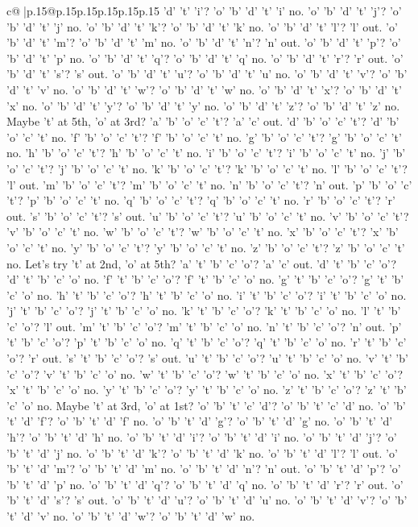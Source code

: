 \documentclass{article}
\begin{document}
{\begin{supertabular}{c@{$\;$}|p{.15\linewidth}@{}p{.15\linewidth}p{.15\linewidth}p{.15\linewidth}p{.15\linewidth}p{.15\linewidth}}
{{{'d' 't' 'i'? 'o' 'b' 'd' 't' 'i' no. 'o' 'b' 'd' 't' 'j'? 'o' 'b' 'd' 't' 'j' no. 'o' 'b' 'd' 't' 'k'? 'o' 'b' 'd' 't' 'k' no. 'o' 'b' 'd' 't' 'l'? 'l' out. 'o' 'b' 'd' 't' 'm'? 'o' 'b' 'd' 't' 'm' no. 'o' 'b' 'd' 't' 'n'? 'n' out. 'o' 'b' 'd' 't' 'p'? 'o' 'b' 'd' 't' 'p' no. 'o' 'b' 'd' 't' 'q'? 'o' 'b' 'd' 't' 'q' no. 'o' 'b' 'd' 't' 'r'? 'r' out. 'o' 'b' 'd' 't' 's'? 's' out. 'o' 'b' 'd' 't' 'u'? 'o' 'b' 'd' 't' 'u' no. 'o' 'b' 'd' 't' 'v'? 'o' 'b' 'd' 't' 'v' no. 'o' 'b' 'd' 't' 'w'? 'o' 'b' 'd' 't' 'w' no. 'o' 'b' 'd' 't' 'x'? 'o' 'b' 'd' 't' 'x' no. 'o' 'b' 'd' 't' 'y'? 'o' 'b' 'd' 't' 'y' no. 'o' 'b' 'd' 't' 'z'? 'o' 'b' 'd' 't' 'z' no. Maybe 't' at 5th, 'o' at 3rd? 'a' 'b' 'o' 'c' 't'? 'a' 'c' out. 'd' 'b' 'o' 'c' 't'? 'd' 'b' 'o' 'c' 't' no. 'f' 'b' 'o' 'c' 't'? 'f' 'b' 'o' 'c' 't' no. 'g' 'b' 'o' 'c' 't'? 'g' 'b' 'o' 'c' 't' no. 'h' 'b' 'o' 'c' 't'? 'h' 'b' 'o' 'c' 't' no. 'i' 'b' 'o' 'c' 't'? 'i' 'b' 'o' 'c' 't' no. 'j' 'b' 'o' 'c' 't'? 'j' 'b' 'o' 'c' 't' no. 'k' 'b' 'o' 'c' 't'? 'k' 'b' 'o' 'c' 't' no. 'l' 'b' 'o' 'c' 't'? 'l' out. 'm' 'b' 'o' 'c' 't'? 'm' 'b' 'o' 'c' 't' no. 'n' 'b' 'o' 'c' 't'? 'n' out. 'p' 'b' 'o' 'c' 't'? 'p' 'b' 'o' 'c' 't' no. 'q' 'b' 'o' 'c' 't'? 'q' 'b' 'o' 'c' 't' no. 'r' 'b' 'o' 'c' 't'? 'r' out. 's' 'b' 'o' 'c' 't'? 's' out. 'u' 'b' 'o' 'c' 't'? 'u' 'b' 'o' 'c' 't' no. 'v' 'b' 'o' 'c' 't'? 'v' 'b' 'o' 'c' 't' no. 'w' 'b' 'o' 'c' 't'? 'w' 'b' 'o' 'c' 't' no. 'x' 'b' 'o' 'c' 't'? 'x' 'b' 'o' 'c' 't' no. 'y' 'b' 'o' 'c' 't'? 'y' 'b' 'o' 'c' 't' no. 'z' 'b' 'o' 'c' 't'? 'z' 'b' 'o' 'c' 't' no. Let's try 't' at 2nd, 'o' at 5th? 'a' 't' 'b' 'c' 'o'? 'a' 'c' out. 'd' 't' 'b' 'c' 'o'? 'd' 't' 'b' 'c' 'o' no. 'f' 't' 'b' 'c' 'o'? 'f' 't' 'b' 'c' 'o' no. 'g' 't' 'b' 'c' 'o'? 'g' 't' 'b' 'c' 'o' no. 'h' 't' 'b' 'c' 'o'? 'h' 't' 'b' 'c' 'o' no. 'i' 't' 'b' 'c' 'o'? 'i' 't' 'b' 'c' 'o' no. 'j' 't' 'b' 'c' 'o'? 'j' 't' 'b' 'c' 'o' no. 'k' 't' 'b' 'c' 'o'? 'k' 't' 'b' 'c' 'o' no. 'l' 't' 'b' 'c' 'o'? 'l' out. 'm' 't' 'b' 'c' 'o'? 'm' 't' 'b' 'c' 'o' no. 'n' 't' 'b' 'c' 'o'? 'n' out. 'p' 't' 'b' 'c' 'o'? 'p' 't' 'b' 'c' 'o' no. 'q' 't' 'b' 'c' 'o'? 'q' 't' 'b' 'c' 'o' no. 'r' 't' 'b' 'c' 'o'? 'r' out. 's' 't' 'b' 'c' 'o'? 's' out. 'u' 't' 'b' 'c' 'o'? 'u' 't' 'b' 'c' 'o' no. 'v' 't' 'b' 'c' 'o'? 'v' 't' 'b' 'c' 'o' no. 'w' 't' 'b' 'c' 'o'? 'w' 't' 'b' 'c' 'o' no. 'x' 't' 'b' 'c' 'o'? 'x' 't' 'b' 'c' 'o' no. 'y' 't' 'b' 'c' 'o'? 'y' 't' 'b' 'c' 'o' no. 'z' 't' 'b' 'c' 'o'? 'z' 't' 'b' 'c' 'o' no. Maybe 't' at 3rd, 'o' at 1st? 'o' 'b' 't' 'c' 'd'? 'o' 'b' 't' 'c' 'd' no. 'o' 'b' 't' 'd' 'f'? 'o' 'b' 't' 'd' 'f' no. 'o' 'b' 't' 'd' 'g'? 'o' 'b' 't' 'd' 'g' no. 'o' 'b' 't' 'd' 'h'? 'o' 'b' 't' 'd' 'h' no. 'o' 'b' 't' 'd' 'i'? 'o' 'b' 't' 'd' 'i' no. 'o' 'b' 't' 'd' 'j'? 'o' 'b' 't' 'd' 'j' no. 'o' 'b' 't' 'd' 'k'? 'o' 'b' 't' 'd' 'k' no. 'o' 'b' 't' 'd' 'l'? 'l' out. 'o' 'b' 't' 'd' 'm'? 'o' 'b' 't' 'd' 'm' no. 'o' 'b' 't' 'd' 'n'? 'n' out. 'o' 'b' 't' 'd' 'p'? 'o' 'b' 't' 'd' 'p' no. 'o' 'b' 't' 'd' 'q'? 'o' 'b' 't' 'd' 'q' no. 'o' 'b' 't' 'd' 'r'? 'r' out. 'o' 'b' 't' 'd' 's'? 's' out. 'o' 'b' 't' 'd' 'u'? 'o' 'b' 't' 'd' 'u' no. 'o' 'b' 't' 'd' 'v'? 'o' 'b' 't' 'd' 'v' no. 'o' 'b' 't' 'd' 'w'? 'o' 'b' 't' 'd' 'w' no. }}}
\end{supertabular}}
\end{document}
